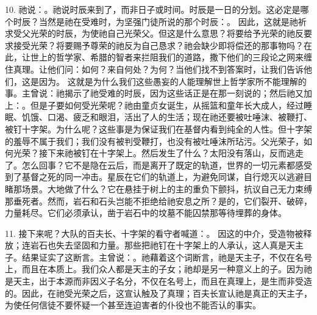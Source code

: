 10. 祂说：。祂说时辰来到了，而非日子或时间。时辰是一日的分划。这必定是哪个时辰？当然是祂在受难时，为坚强门徒所说的那个时辰：。 因此，这就是祂祈求受父光荣的时辰，为使祂自己光荣父。但这是什么意思？将要给予光荣的祂反要求接受光荣？将要赐予尊荣的祂反为自己恳求？祂会缺少即将偿还的那事物吗？在此，让世上的哲学家、希腊的智者来拦阻我们的道路，撒下他们的三段论之网来缠住真理。让他们问：如何？来自何处？为何？当他们找不到答案时，让我们告诉他们，这是因为。 这就是为什么我们这些愚妄的人能理解世上哲学家所不能理解的事。主曾说：祂揭示了祂受难的时辰，因为这些话正是在那一刻说的；然后祂又加上：。但是子要如何受光荣呢？祂由童贞女诞生，从摇篮和童年长大成人，经过睡眠、饥饿、口渴、疲乏和眼泪，活出了人的生活；现在祂还要被吐唾沫、被鞭打、被钉十字架。为什么呢？这些事是为保证我们在基督内看到纯全的人性。但十字架的羞辱不属于我们；我们没有被判受鞭打，也没有被吐唾沫所玷污。父光荣子，如何光荣？接下来祂被钉在十字架上。然后发生了什么？太阳没有落山，反而逃走了。怎么回事？它不是隐在云后，而是离开了既定的轨道，世界的一切元素都感受到了基督之死的同一冲击。星辰在它们的轨道上，为避免同谋，自行熄灭以逃避目睹那场景。大地做了什么？它在悬挂于树上的主的重负下颤抖，抗议自己无力束缚那垂死者。然而，岩石和石头岂能不拒绝给祂安息之所？是的，它们裂开、破碎，力量耗尽。它们必须承认，凿于岩石中的坟墓不能囚禁那等待埋葬的身体。\par

11. 接下来呢？大队的百夫长、十字架的看守者喊道：。 因这的中介，受造物被释放；连岩石也失去坚固和力量。那些把祂钉在十字架上的人承认，这人真是天主子。结果证实了这断言。主曾说：。祂藉着这个词断言，祂是天主子，不仅在名号上，而且在本质上。我们众人都是天主的子女；祂却是另一种意义上的子。因为祂是天主，出于本源而非因义子名分，不仅在名号上，而且在真理上，是生而非受造的。因此，在祂受光荣之后，这宣认触及了真理；百夫长宣认祂是真正的天主子，为使任何信徒不要怀疑一个甚至连迫害者的仆役也不能否认的事实。\par


